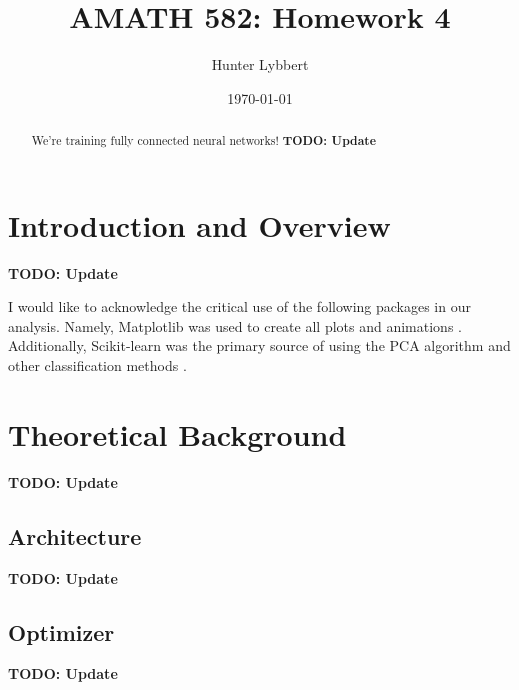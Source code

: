\documentclass[11pt]{amsart}
\title{AMATH 582: Homework 4}
\author{Hunter Lybbert} %
\date{\today} %
\begin{document}
\maketitle

\begin{abstract}
    We're training fully connected neural networks! \textbf{TODO: Update}
\end{abstract}

\section{Introduction and Overview}\label{sec:Introduction}
\textbf{TODO: Update}

I would like to acknowledge the critical use of the following packages in our analysis.
Namely, Matplotlib was used to create all plots and animations \cite{Hunter:2007}.
Additionally, Scikit-learn was the primary source of using the PCA algorithm and other classification methods \cite{scikit-learn}.


\section{Theoretical Background}\label{sec:theory}
\textbf{TODO: Update}

\subsection{Architecture}
\textbf{TODO: Update}

\subsection{Optimizer}
\textbf{TODO: Update}
\end{document}
